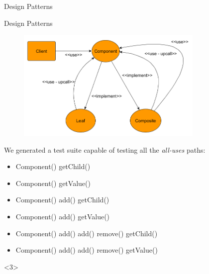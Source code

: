 \documentclass{beamer}
\begin{document}
\begin{section}{Design Patterns}
\begin{subsection}{Design Patterns}
\begin{frame}
{\begin{figure}[!h]
	\centering
	\includegraphics[width=0.8\textwidth]{./Composite/ClassDepencyGraph.png}	
	\label{Codepengraph}
\end{figure}
We generated a test suite capable of testing all the \textit{all-uses} paths:
\begin{itemize}
	\item Component() getChild()
	\item Component() getValue()
	\item Component() add() getChild()
	\item Component() add() getValue()
	\item Component() add() add() remove() getChild()
	\item Component() add() add() remove() getValue() 
\end{itemize}}<3> 		

\end{frame}
\end{subsection}
\end{section}
\end{document}
